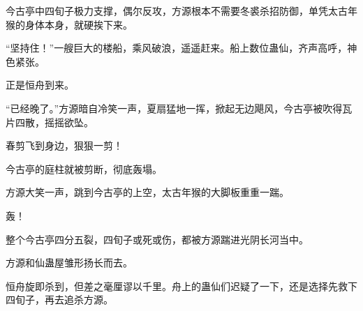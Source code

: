 \begin{this_body}
今古亭中四旬子极力支撑，偶尔反攻，方源根本不需要冬裘杀招防御，单凭太古年猴的身体本身，就硬挨下来。

“坚持住！”一艘巨大的楼船，乘风破浪，遥遥赶来。船上数位蛊仙，齐声高呼，神色紧张。

正是恒舟到来。

“已经晚了。”方源暗自冷笑一声，夏扇猛地一挥，掀起无边飓风，今古亭被吹得瓦片四散，摇摇欲坠。

春剪飞到身边，狠狠一剪！

今古亭的庭柱就被剪断，彻底轰塌。

方源大笑一声，跳到今古亭的上空，太古年猴的大脚板重重一踹。

轰！

整个今古亭四分五裂，四旬子或死或伤，都被方源踹进光阴长河当中。

方源和仙蛊屋雏形扬长而去。

恒舟旋即杀到，但差之毫厘谬以千里。舟上的蛊仙们迟疑了一下，还是选择先救下四旬子，再去追杀方源。

\end{this_body}

